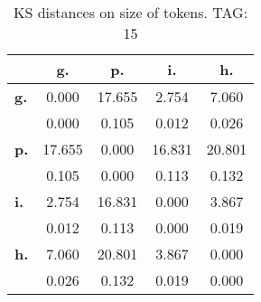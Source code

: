 \begin{table}[h!]
\begin{center}
\begin{tabular}{| l || c | c | c | c |}\hline
 & {\bf g.} & {\bf p.} & {\bf i.} & {\bf h.} \\\hline\hline
{\bf g.} & 0.000 & 17.655 & 2.754 & 7.060 \\
{\bf } & 0.000 & 0.105 & 0.012 & 0.026 \\\hline
{\bf p.} & 17.655 & 0.000 & 16.831 & 20.801 \\
{\bf } & 0.105 & 0.000 & 0.113 & 0.132 \\\hline
{\bf i.} & 2.754 & 16.831 & 0.000 & 3.867 \\
{\bf } & 0.012 & 0.113 & 0.000 & 0.019 \\\hline
{\bf h.} & 7.060 & 20.801 & 3.867 & 0.000 \\
{\bf } & 0.026 & 0.132 & 0.019 & 0.000 \\\hline
\end{tabular}
\caption{KS distances on size of tokens. TAG: 15}
\end{center}
\end{table}